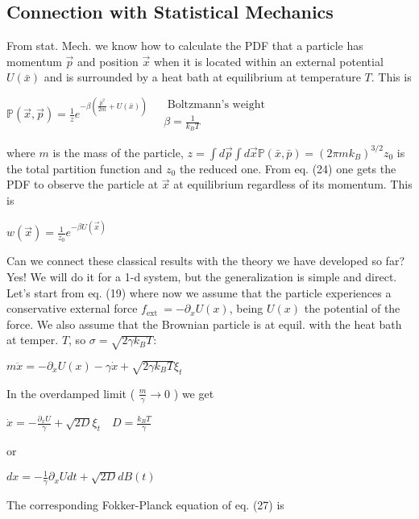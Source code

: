 \subsection*{Connection with Statistical Mechanics}
From stat. Mech. we know how to calculate the PDF that a particle has momentum $\vec{p}$ and position $\vec{x}$ when it is located within an external potential $U(\bar{x})$ and is surrounded by a heat bath at equilibrium at temperature $T$. This is
\begin{DispWithArrows}[tag=24]
    $\mathbb{P}(\vec{x}, \vec{p})=\frac{1}{z} e^{-\beta\left(\frac{\bar{p}^{2}}{2 m}+U(\bar{x})\right)} \quad \begin{gathered}\text { Boltzmann's weight } \\\beta=\frac{1}{k_{B} T}\end{gathered}$
\end{DispWithArrows}
where $m$ is the mass of the particle, $z=\int d \vec{p} \int d \vec{x} \mathbb{P}(\bar{x}, \bar{p})=\left(2 \pi m k_{B}\right)^{3 / 2} z_{0}$ is the total partition function and $z_{0}$ the reduced one. From eq. (24) one gets the PDF to observe the particle at $\vec{x}$ at equilibrium regardless of its momentum. This is
\begin{DispWithArrows}[tag=25]
    $w(\vec{x})=\frac{1}{z_{0}} e^{-\beta U(\vec{x})}$
\end{DispWithArrows}
Can we connect these classical results with the theory we have developed so far? Yes! We will do it for a 1-d system, but the generalization is simple and direct. Let's start from eq. (19) where now we assume that the particle experiences a conservative external force $f_{\text {ext }}=-\partial_{x} U(x)$, being $U(x)$ the potential of the force. We also assume that the Brownian particle is at equil. with the heat bath at temper. $T$, so $\sigma=\sqrt{2 \gamma k_{B} T}$:
\begin{DispWithArrows}[tag=26]
    $m \ddot{x}=-\partial_{x} U(x)-\gamma \dot{x}+\sqrt{2 \gamma k_{B} T} \xi_{t}$
\end{DispWithArrows}
In the overdamped limit ( $\frac{m}{\gamma} \rightarrow 0$ ) we get
\begin{DispWithArrows}[tag=27]
    $\dot{x}=-\frac{\partial_{x} U}{\gamma}+\sqrt{2 D} \xi_{t} \quad D=\frac{k_{B} T}{\gamma}$
\end{DispWithArrows}
or
\begin{DispWithArrows}
    $d x=-\frac{1}{\gamma} \partial_{x} U d t+\sqrt{2 D} d B(t)$
\end{DispWithArrows}
The corresponding Fokker-Planck equation of eq. (27) is
